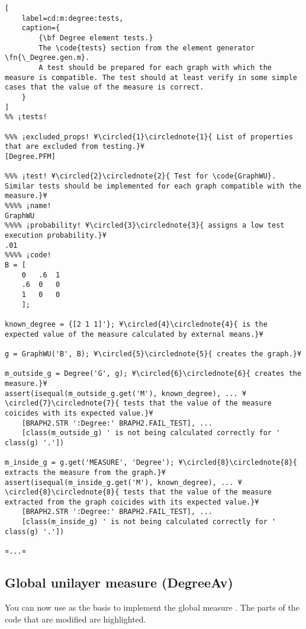 \documentclass{tufte-handout}
\begin{document}
\begin{lstlisting}[
	label=cd:m:degree:tests,
	caption={
		{\bf Degree element tests.}
		The \code{tests} section from the element generator \fn{\_Degree.gen.m}.
		A test should be prepared for each graph with which the measure is compatible. The test should at least verify in some simple cases that the value of the measure is correct.
	}
]
%% ¡tests!

%%% ¡excluded_props! ¥\circled{1}\circlednote{1}{ List of properties that are excluded from testing.}¥
[Degree.PFM] 

%%% ¡test! ¥\circled{2}\circlednote{2}{ Test for \code{GraphWU}. Similar tests should be implemented for each graph compatible with the measure.}¥
%%%% ¡name!
GraphWU
%%%% ¡probability! ¥\circled{3}\circlednote{3}{ assigns a low test execution probability.}¥
.01
%%%% ¡code!
B = [
    0   .6  1
    .6  0   0
    1   0   0
    ];

known_degree = {[2 1 1]'}; ¥\circled{4}\circlednote{4}{ is the expected value of the measure calculated by external means.}¥

g = GraphWU('B', B); ¥\circled{5}\circlednote{5}{ creates the graph.}¥

m_outside_g = Degree('G', g); ¥\circled{6}\circlednote{6}{ creates the measure.}¥
assert(isequal(m_outside_g.get('M'), known_degree), ... ¥\circled{7}\circlednote{7}{ tests that the value of the measure coicides with its expected value.}¥ 
    [BRAPH2.STR ':Degree:' BRAPH2.FAIL_TEST], ...
    [class(m_outside_g) ' is not being calculated correctly for ' class(g) '.'])

m_inside_g = g.get('MEASURE', 'Degree'); ¥\circled{8}\circlednote{8}{ extracts the measure from the graph.}¥
assert(isequal(m_inside_g.get('M'), known_degree), ... ¥\circled{8}\circlednote{8}{ tests that the value of the measure extracted from the graph coicides with its expected value.}¥
    [BRAPH2.STR ':Degree:' BRAPH2.FAIL_TEST], ...
    [class(m_inside_g) ' is not being calculated correctly for ' class(g) '.'])

¤...¤
\end{lstlisting}

\clearpage

\subsection{Global unilayer measure (DegreeAv)}

You can now use  as the basis to implement the global measure .
{%
The parts of the code that are modified are highlighted.
}%
\end{document}
